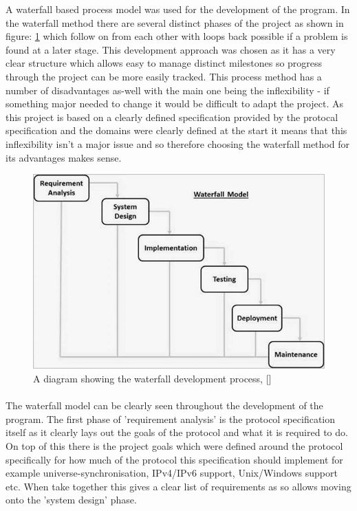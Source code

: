 \documentclass[11pt,a4paper]{report}
\begin{document}
A waterfall based process model was used for the development of the program. In the waterfall method there are several distinct phases of the project as shown in figure: \ref{waterfall-diag} which follow on from each other with loops back possible if a problem is found at a later stage. This development approach was chosen as it has a very clear structure which allows easy to manage distinct milestones so progress through the project can be more easily tracked. This process method has a number of disadvantages as-well with the main one being the inflexibility - if something major needed to change it would be difficult to adapt the project.  As this project is based on a clearly defined specification provided by the protocal specification and the domains were  clearly defined at the start it means that this inflexibility isn't a major issue and so therefore choosing the waterfall method for its advantages makes sense. 
	
\begin{figure}
	\label{waterfall-diag}
	\includegraphics[width=\textwidth]{sdlc_waterfall_model.jpg}
	\caption{A diagram showing the waterfall development process, [\cite{waterfall-diagram}]}
\end{figure}

\paragraph*{}
The waterfall model can be clearly seen throughout the development of the program. The first phase of 'requirement analysis' is the protocol specification itself as it clearly lays out the goals of the protocol and what it is required to do. On top of this there is the project goals which were defined around the protocol specifically for how much of the protocol this specification should implement for example universe-synchronisation, IPv4/IPv6 support, Unix/Windows support etc. When take together this gives a clear list of requirements as so allows moving onto the 'system design' phase.
\end{document}
